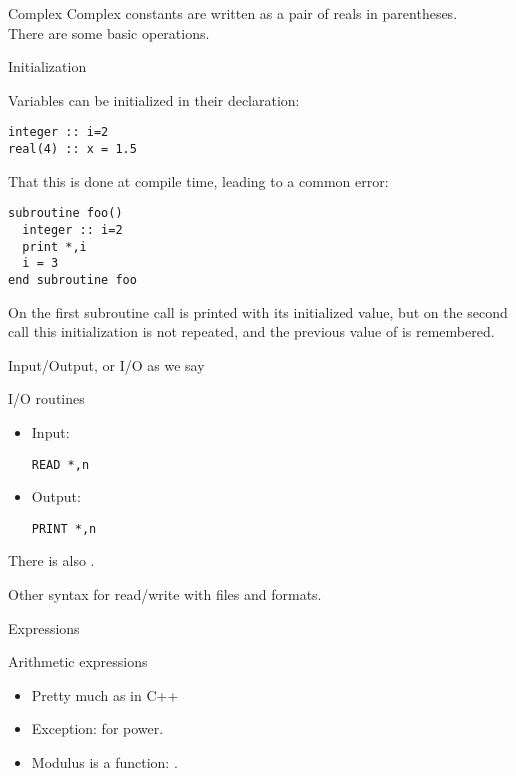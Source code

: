 \begin{block}{Complex}
  \label{sl:fcomplex}
  Complex constants are written as a pair of reals in parentheses.\\
  There are some basic operations.
\end{block}

 {Initialization}

Variables can be initialized in their declaration:
\begin{verbatim}
integer :: i=2
real(4) :: x = 1.5
\end{verbatim}

That this is done at compile time, leading to a common error:
\begin{verbatim}
subroutine foo()
  integer :: i=2
  print *,i
  i = 3
end subroutine foo
\end{verbatim}
On the first subroutine call  is printed with its initialized
value, but on the second call this initialization is not repeated, and
the previous value of  is remembered.

 {Input/Output, or I/O as we say}
\label{sec:fio}

\begin{block}{I/O routines}
  \label{sl:frw}
  \begin{itemize}
  \item Input: 
\begin{verbatim}
READ *,n
\end{verbatim}
\item Output:
\begin{verbatim}
PRINT *,n
\end{verbatim}
  \end{itemize}
  There is also .

  Other syntax for read/write with files and formats.
\end{block}

 {Expressions}
\label{sec:fexpr}

\begin{block}{Arithmetic expressions}
  \label{sl:farith}
  \begin{itemize}
  \item Pretty much as in C++
  \item Exception:  for power.
  \item Modulus is a function: .
  \end{itemize}
\end{block}

